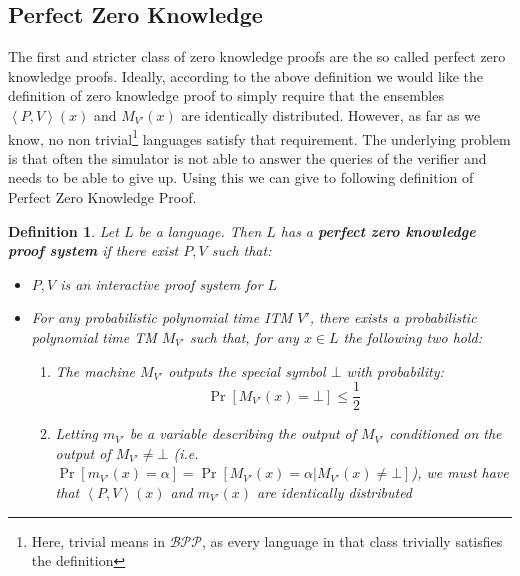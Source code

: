 \documentclass{article}
\newtheorem{definition}{Definition}
\begin{document}
\subsection{Perfect Zero Knowledge}
The first and stricter class of zero knowledge proofs are the so called perfect zero knowledge proofs. Ideally, according to the above definition we would like the definition of zero knowledge proof to simply require that the ensembles $\left<P, V\right>(x)$ and $M_{V'}(x)$ are identically distributed. However, as far as we know, no non trivial\footnote{Here, trivial means in $\mathcal{BPP}$, as every language in that class trivially satisfies the definition} languages satisfy that requirement. The underlying problem is that often the simulator is not able to answer the queries of the verifier and needs to be able to give up. Using this we can give to following definition of Perfect Zero Knowledge Proof.
\begin{definition}
Let $L$ be a language. Then $L$ has a \textbf{perfect zero knowledge proof system} if there exist $P, V$ such that:
\begin{itemize}
    \item $P, V$ is an interactive proof system for $L$
    \item For any probabilistic polynomial time ITM $V'$, there exists a probabilistic polynomial time TM $M_{V'}$ such that, for any $x \in L$ the following two hold:
    \begin{enumerate}
        \item The machine $M_{V'}$ outputs the special symbol $\bot$ with probability: \[\Pr[M_{V'}(x) = \bot] \leq \frac{1}{2}\]
        \item Letting $m_{V'}$ be a variable describing the output of $M_{V'}$ conditioned on the output of $M_{V'} \neq \bot$ (i.e. $\Pr[m_{V'}(x) = \alpha] = \Pr[M_{V'}(x) = \alpha | M_{V'}(x) \neq \bot]$), we must have that $\left<P, V\right>(x)$ and $m_{V'}(x)$ are identically distributed
    \end{enumerate}
\end{itemize}
\end{definition}
\end{document}
